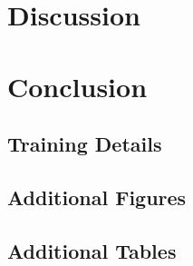 \documentclass[12pt,letterpaper]{article}
\begin{document}

\section{Discussion}





\section{Conclusion}






\makereference






\clearpage
\makeappendix

\subsection{Training Details}

\subsection{Additional Figures}

\subsection{Additional Tables}
\end{document}
